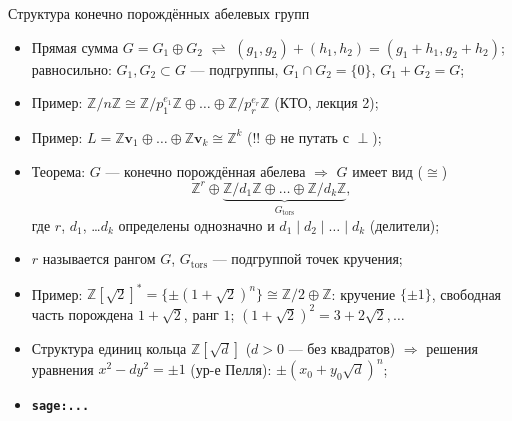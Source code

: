 \documentclass[serif, aspectratio=169]{beamer}
\newcommand{\sagemark}{%
  \textcolor{green!40!black}{\textbf{\texttt{sage:...}}}%
}
\begin{document}
\begin{frame}{Структура конечно порождённых абелевых групп}
    \begin{itemize}
        \item Прямая сумма $G=G_1\oplus G_2$ $\rightleftharpoons$ $(g_1,g_2)+(h_1,h_2)=(g_1+h_1,g_2+h_2)$;\\ равносильно: $G_1,G_2\subset G$ --- подгруппы, $G_1\cap G_2=\{0\}$, $G_1+G_2=G$;
        \item Пример: $\mathbb{Z}/n\mathbb{Z}\cong\mathbb{Z}/p_1^{e_1}\mathbb{Z}\oplus\dots\oplus\mathbb{Z}/p_r^{e_r}\mathbb{Z}$ (КТО, лекция 2);
        \item Пример: $L=\mathbb{Z}\mathbf{v}_1\oplus\dots\oplus\mathbb{Z}\mathbf{v}_k \cong\mathbb{Z}^k$ (!! $\oplus$ не путать с $\perp$);
        \item Теорема: $G$ --- конечно порождённая абелева $\Rightarrow$ $G$ имеет вид ($\cong$)
        \[\mathbb{Z}^r\oplus\underbrace{\mathbb{Z}/d_1 \mathbb{Z}\oplus\dots\oplus\mathbb{Z}/d_k \mathbb{Z}}_{G_{\text{tors}}},\]
        где $r$, $d_1$, \dots $d_k$ определены однозначно и $d_1\mid d_2\mid\dots\mid d_k$ (делители);
        \item $r$ называется рангом $G$, $G_{\text{tors}}$ --- подгруппой точек кручения;
        \item Пример: $\mathbb{Z}[\sqrt2]^*=\{\pm(1+\sqrt2)^n\}\cong\mathbb{Z}/2\oplus\mathbb{Z}$: кручение $\{\pm1\}$, свободная часть порождена $1+\sqrt2$, ранг $1$; $(1+\sqrt2)^2=3+2\sqrt2, \dots$
        \item Структура единиц кольца $\mathbb{Z}[\sqrt d]$ ($d>0$ --- без квадратов) $\Rightarrow$ решения уравнения $x^2-dy^2=\pm1$ (ур-е Пелля): $\pm(x_0+y_0\sqrt d)^n$;
        \item \sagemark
    \end{itemize}
\end{frame}
\end{document}
